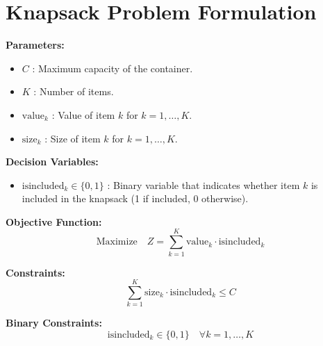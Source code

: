 \documentclass{article}
\begin{document}
\section*{Knapsack Problem Formulation}

\textbf{Parameters:}
\begin{itemize}
    \item \( C \) : Maximum capacity of the container.
    \item \( K \) : Number of items.
    \item \( \text{value}_k \) : Value of item \( k \) for \( k = 1, \ldots, K \).
    \item \( \text{size}_k \) : Size of item \( k \) for \( k = 1, \ldots, K \).
\end{itemize}

\textbf{Decision Variables:}
\begin{itemize}
    \item \( \text{isincluded}_k \in \{0, 1\} \) : Binary variable that indicates whether item \( k \) is included in the knapsack (1 if included, 0 otherwise).
\end{itemize}

\textbf{Objective Function:}
\[
\text{Maximize} \quad Z = \sum_{k=1}^{K} \text{value}_k \cdot \text{isincluded}_k
\]

\textbf{Constraints:}
\[
\sum_{k=1}^{K} \text{size}_k \cdot \text{isincluded}_k \leq C
\]

\textbf{Binary Constraints:}
\[
\text{isincluded}_k \in \{0, 1\} \quad \forall k = 1, \ldots, K
\]
\end{document}
